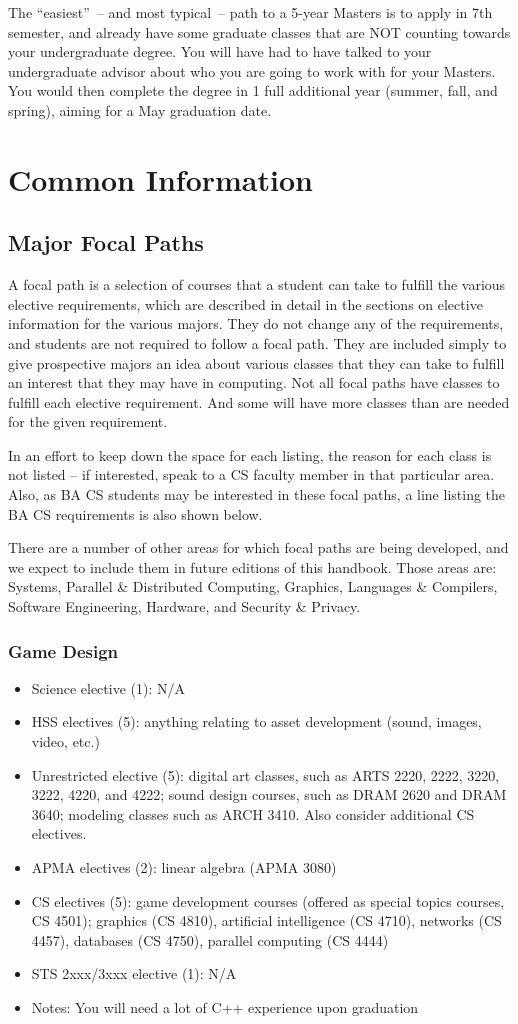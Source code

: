 \documentclass[10pt,letter]{book}
\newenvironment{itemlist}{
\begin{itemize}
\setlength{\itemsep}{0pt}
\setlength{\parskip}{0pt}}
{\end{itemize}}
\newcommand{\mychapter}[2]{\chapter{#1}\renewcommand{\leftmark}{\textsc{#2}}}
\newcommand{\mysection}[1]{\section{#1}\renewcommand{\rightmark}{#1}}
\begin{document}
The ``easiest''~-- and most typical~-- path to a 5-year Masters is to
apply in 7th semester, and already have some graduate classes that are
NOT counting towards your undergraduate degree.  You will have had to
have talked to your undergraduate advisor about who you are going to
work with for your Masters.  You would then complete the degree in 1
full additional year (summer, fall, and spring), aiming for a May
graduation date.


\clearpage
\mychapter{Common Information}{Common Information}

\mysection{Major Focal Paths}

A focal path is a selection of courses that a student can take to
fulfill the various elective requirements, which are described in
detail in the sections on elective information for the various
majors. They do not change any of the requirements, and students are
not required to follow a focal path. They are included simply to give
prospective majors an idea about various classes that they can take to
fulfill an interest that they may have in computing. Not all focal
paths have classes to fulfill each elective requirement. And some will
have more classes than are needed for the given requirement.

In an effort to keep down the space for each listing, the reason for
each class is not listed – if interested, speak to a CS faculty member
in that particular area. Also, as BA CS students may be interested in
these focal paths, a line listing the BA CS requirements is also shown
below.

There are a number of other areas for which focal paths are being
developed, and we expect to include them in future editions of this
handbook. Those areas are: Systems, Parallel \& Distributed Computing,
Graphics, Languages \& Compilers, Software Engineering, Hardware, and
Security \& Privacy.


\subsection{Game Design}
\begin{itemlist}
\item Science elective (1): N/A
\item HSS electives (5): anything relating to asset development
  (sound, images, video, etc.)
\item Unrestricted elective (5): digital art classes, such as ARTS
  2220, 2222, 3220, 3222, 4220, and 4222; sound design courses, such
  as DRAM 2620 and DRAM 3640; modeling classes such as ARCH 3410.
  Also consider additional CS electives.
\item APMA electives (2): linear algebra (APMA 3080)
\item CS electives (5): game development courses (offered as special
  topics courses, CS 4501); graphics (CS 4810), artificial
  intelligence (CS 4710), networks (CS 4457), databases (CS 4750),
  parallel computing (CS 4444)
\item STS 2xxx/3xxx elective (1): N/A
\item Notes: You will need a lot of C++ experience upon graduation
\end{itemlist}
\end{document}
